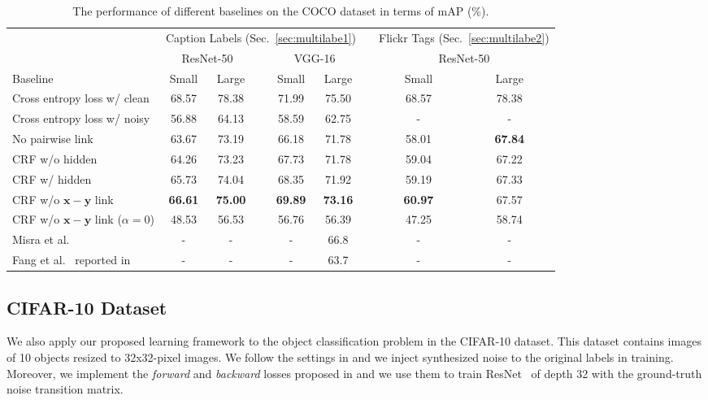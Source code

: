 \documentclass{article}
\newcommand{\x}{{\pmb{x}}}
\newcommand{\y}{{\pmb{y}}}
\begin{document}
\begin{table}[t]
\caption{The performance of different baselines on the COCO dataset in terms of mAP (\%).} \label{table:coco}
\centering
\begin{tabular}{ lcccccccc }
\multicolumn{1}{c}{} & \multicolumn{5}{c}{Caption Labels (Sec.~\ref{sec:multilabe1})} && \multicolumn{2}{c}{Flickr Tags (Sec.~\ref{sec:multilabe2})} \\
\cline{2-6} \cline{8-9}
 \multicolumn{1}{c}{} & \multicolumn{2}{c}{ResNet-50} && \multicolumn{2}{c}{VGG-16} &&\multicolumn{2}{c}{ResNet-50} \\
 \cline{2-3}\cline{5-6} \cline{8-9}
 Baseline  & Small & Large && Small & Large && Small & Large \\
\hline
 Cross entropy loss w/ clean & 68.57 & 78.38 && 71.99 & 75.50  && 68.57 & 78.38\\
 Cross entropy loss w/ noisy & 56.88 & 64.13 && 58.59 & 62.75  && - & - \\
 \hline
No pairwise link & 63.67 & 73.19 && 66.18 & 71.78  && 58.01 & \textbf{67.84}         \\
CRF w/o hidden & 64.26 & 73.23 && 67.73 & 71.78  && 59.04 & 67.22      \\
 CRF w/ hidden & 65.73 & 74.04 && 68.35 & 71.92   && 59.19 & 67.33           \\
CRF w/o $\x-\y$ link & \textbf{66.61} & \textbf{75.00} && \textbf{69.89} & \textbf{73.16} && \textbf{60.97} & 67.57  \\
CRF w/o $\x-\y$ link ($\alpha=0$) & 48.53 & 56.53 && 56.76 & 56.39 && 47.25 & 58.74  \\
 \hline
 Misra et al.~\cite{Misra2016} & - & - && - & 66.8 && - & -  \\
 Fang et al.~\cite{fang2015captions} reported in \cite{Misra2016} & - & - && - & 63.7 && - & -  \\
\end{tabular}
\end{table}

\subsection{CIFAR-10 Dataset} \label{sec:multiclass}
We also apply our proposed learning framework to the object classification problem in the CIFAR-10 dataset. 
This dataset contains images of 10 objects resized to 32x32-pixel images.
We follow the settings in \cite{patrini2016} and we inject synthesized noise to the original labels in training.
Moreover, we implement the \textit{forward} and \textit{backward} losses proposed in \cite{patrini2016} and 
we use them to train ResNet~\cite{he2016deep} of depth 32 with the ground-truth noise transition matrix. 
\end{document}
